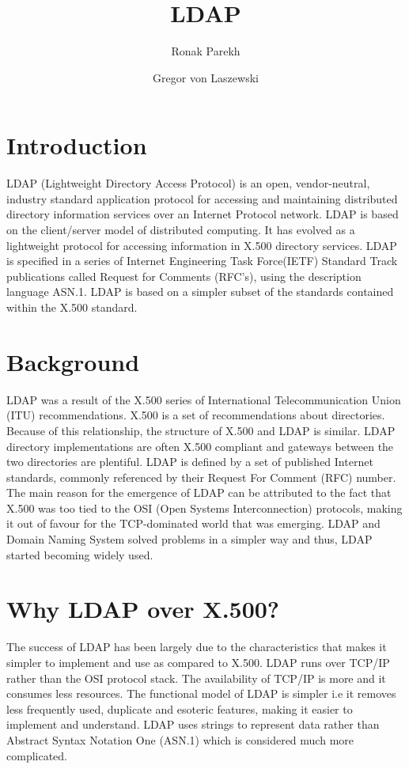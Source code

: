 \documentclass[9pt,twocolumn,twoside]{styles/osajnl}
\title{LDAP}
\author[1]{Ronak Parekh}
\author[2]{Gregor von Laszewski}
\affil[1]{School of Informatics and Computing, Bloomington, IN 47408, U.S.A.}
\affil[*]{Corresponding authors: parekhr@indiana.edu}
\begin{document}
\maketitle

\section{Introduction}

LDAP (Lightweight Directory Access Protocol) is an open,
vendor-neutral, industry standard application protocol for accessing
and maintaining distributed directory information services over an
Internet Protocol network.\cite{www-ldap-wikipedia} LDAP is based on the
client/server model of distributed computing. It has evolved as a
lightweight protocol for accessing information in X.500 directory
services.\cite{ldap-ibm-book} LDAP is specified in a series of
Internet Engineering Task Force(IETF) Standard Track publications
called Request for Comments (RFC's), using the description language
ASN.1. LDAP is based on a simpler subset of the standards contained
within the X.500 standard.

\section{Background}
LDAP was a result of the X.500 series of International
Telecommunication Union (ITU) recommendations.  X.500 is a set of
recommendations about directories. \cite{ldap-ibm-book} Because of this
relationship, the structure of X.500 and LDAP is similar. LDAP
directory implementations are often X.500 compliant and gateways
between the two directories are plentiful. LDAP is defined by a set of
published Internet standards, commonly referenced by their Request For
Comment (RFC) number. The main reason for the emergence of LDAP can be
attributed to the fact that X.500 was too tied to the OSI (Open
Systems Interconnection) protocols, making it out of favour for the
TCP-dominated world that was emerging. LDAP and Domain Naming System
solved problems in a simpler way and thus, LDAP started becoming
widely used. \cite{ldap-ibm-book}

\section{Why LDAP over X.500?}
The success of LDAP has been largely due to the characteristics that
makes it simpler to implement and use as compared to X.500. LDAP runs
over TCP/IP rather than the OSI protocol stack. The availability of
TCP/IP is more and it consumes less resources. The functional model of
LDAP is simpler i.e it removes less frequently used, duplicate and
esoteric features, making it easier to implement and understand. LDAP
uses strings to represent data rather than Abstract Syntax Notation
One (ASN.1) which is considered much more
complicated.\cite{ldap-ibm-book}
\end{document}
